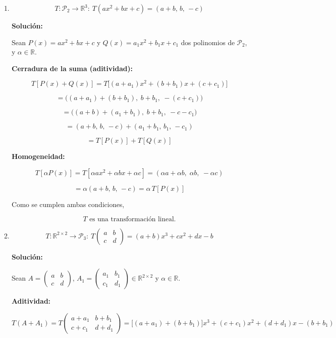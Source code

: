 \documentclass[12pt]{article}
\newcommand{\solucion}{%
    \vspace{0.8em}%
    \textbf{Solución:}%
    \vspace{0.8em}%
}
\begin{document}
\begin{enumerate}[label=\alph*.-]

    \item
    \[
    T:\mathcal{P}_2\to\mathbb{R}^3:\ T(ax^2+bx+c)=(a+b,\,b,\,-c)
    \]

    \solucion

    Sean $P(x)=ax^2+bx+c$ y $Q(x)=a_1x^2+b_1x+c_1$ dos polinomios de
    $\mathcal{P}_2$, y $\alpha\in\mathbb{R}$.

    \textbf{Cerradura de la suma (aditividad):}

    \[
    T[P(x)+Q(x)]=T\big[(a+a_1)x^2+(b+b_1)x+(c+c_1)\big]
    \]

    \[
    =\big((a+a_1)+(b+b_1),\; b+b_1,\; -(c+c_1)\big)
    \]

    \[
    =\big((a+b)+(a_1+b_1),\; b+b_1,\; -c-c_1\big)
    \]

    \[
    =(a+b,\,b,\,-c)+(a_1+b_1,\,b_1,\,-c_1)
    \]

    \[
    =T[P(x)]+T[Q(x)]
    \]

    \textbf{Homogeneidad:}

    \[
    T[\alpha P(x)]=T[\alpha a x^2+\alpha b x+\alpha c]
    =(\alpha a+\alpha b,\;\alpha b,\;-\alpha c)
    \]

    \[
    =\alpha(a+b,\,b,\,-c)=\alpha\,T[P(x)]
    \]

    Como se cumplen ambas condiciones,

    \[
    \boxed{T \text{ es una transformación lineal.}}
    \]

			\newpage
    \item
    \[
    T:\mathbb{R}^{2\times2}\to\mathcal{P}_3:\
    T\begin{pmatrix}a&b\\c&d\end{pmatrix}=(a+b)x^3+cx^2+dx-b
    \]

    \solucion

    Sean $A=\begin{pmatrix}a&b\\c&d\end{pmatrix}$,
    $A_1=\begin{pmatrix}a_1&b_1\\c_1&d_1\end{pmatrix}\in\mathbb{R}^{2\times2}$
    y $\alpha\in\mathbb{R}$.

    \textbf{Aditividad:}

    \[
    T(A+A_1)=T\begin{pmatrix}a+a_1&b+b_1\\c+c_1&d+d_1\end{pmatrix}
    =\big[(a+a_1)+(b+b_1)\big]x^3+(c+c_1)x^2+(d+d_1)x-(b+b_1)
    \]


\end{enumerate}
\end{document}
